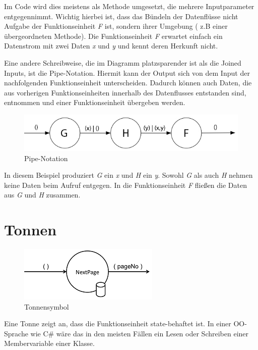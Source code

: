 Im Code wird dies meistens als Methode umgesetzt, die mehrere Inputparameter entgegennimmt.
Wichtig hierbei ist, dass das Bündeln der Datenflüsse nicht Aufgabe der
Funktionseinheit \textit{F} ist, sondern ihrer Umgebung ( z.B einer übergeordneten Methode).
Die Funktionseinheit \textit{F} erwartet einfach ein Datenstrom mit zwei Daten \textit{x} und \textit{y}
und kennt deren Herkunft nicht.

\bigskip
Eine andere Schreibweise, die im Diagramm platzsparender ist als die Joined Inputs, ist die Pipe-Notation.
Hiermit kann der Output sich von dem Input der nachfolgenden Funktionseinheit unterscheiden.
Dadurch können auch Daten, die aus vorherigen Funktionseinheiten innerhalb des Datenflusses entstanden sind, entnommen und einer Funktionseinheit
übergeben werden.

\begin{figure}[H]
	\centering
	\includegraphics[width=\linewidth]{./img/diagramPipe.jpg}
	\caption{Pipe-Notation}
\end{figure}

In diesem Beispiel produziert \textit{G} ein \textit{x} und \textit{H} ein \textit{y}. Sowohl \textit{G} als auch \textit{H} nehmen keine Daten beim Aufruf entgegen.
In die Funktionseinheit \textit{F} fließen die Daten aus \textit{G} und \textit{H} zusammen.

\section{Tonnen}

\begin{figure}[H]
	\centering
		\includegraphics[width=.7\linewidth]{./img/diagramTonne.png}
	\caption{Tonnensymbol}
\end{figure}



Eine Tonne zeigt an, dass die Funktionseinheit state-behaftet ist.
In einer OO-Sprache wie C\# wäre das in den meisten Fällen ein Lesen oder
Schreiben einer Membervariable einer Klasse.

